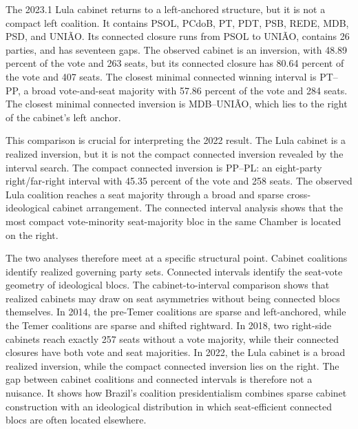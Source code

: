 \documentclass[11pt]{article}
\begin{document}
The 2023.1 Lula cabinet returns to a left-anchored structure, but it is not a
compact left coalition. It contains PSOL, PCdoB, PT, PDT, PSB, REDE, MDB,
PSD, and UNIÃO. Its connected closure runs from PSOL to UNIÃO, contains 26
parties, and has seventeen gaps. The observed cabinet is an inversion, with
48.89 percent of the vote and 263 seats, but its connected closure has 80.64
percent of the vote and 407 seats. The closest minimal connected winning
interval is PT--PP, a broad vote-and-seat majority with 57.86 percent of the
vote and 284 seats. The closest minimal connected inversion is MDB--UNIÃO,
which lies to the right of the cabinet's left anchor.

This comparison is crucial for interpreting the 2022 result. The Lula cabinet is
a realized inversion, but it is not the compact connected inversion revealed by
the interval search. The compact connected inversion is PP--PL: an eight-party
right/far-right interval with 45.35 percent of the vote and 258 seats. The
observed Lula coalition reaches a seat majority through a broad and sparse
cross-ideological cabinet arrangement. The connected interval analysis shows
that the most compact vote-minority seat-majority bloc in the same Chamber is
located on the right.

The two analyses therefore meet at a specific structural point. Cabinet
coalitions identify realized governing party sets. Connected intervals identify
the seat-vote geometry of ideological blocs. The cabinet-to-interval comparison
shows that realized cabinets may draw on seat asymmetries without being
connected blocs themselves. In 2014, the pre-Temer coalitions are sparse and
left-anchored, while the Temer coalitions are sparse and shifted rightward. In
2018, two right-side cabinets reach exactly 257 seats without a vote majority,
while their connected closures have both vote and seat majorities. In 2022, the
Lula cabinet is a broad realized inversion, while the compact connected
inversion lies on the right. The gap between cabinet coalitions and connected
intervals is therefore not a nuisance. It shows how Brazil's coalition
presidentialism combines sparse cabinet construction with an ideological
distribution in which seat-efficient connected blocs are often located elsewhere.







\end{document}
